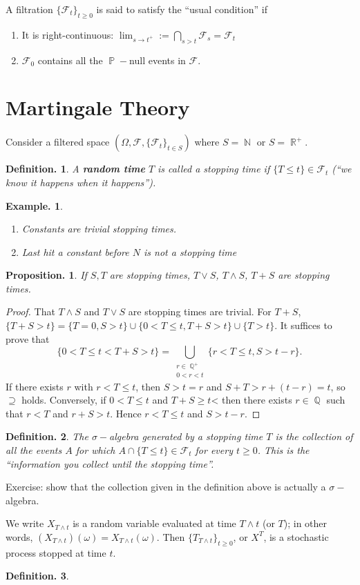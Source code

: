 \documentclass[11pt, a4paper]{memoir}
\DeclareMathOperator{\N}{{\mathbb{N}}}
\DeclareMathOperator{\Q}{{\mathbb{Q}}}
\DeclareMathOperator{\R}{{\mathbb{R}}}
\theoremstyle{change}
\newtheorem{proposition}[theorem]{Proposition.}
\theoremstyle{plain}
\theoremstyle{nonumberplain}
\newtheorem{definition}{Definition.}
\newtheorem{example}{Example.}
\newtheorem{proof}{Proof}
\DeclareMathOperator{\pr}{{\mathbb{P}}}
\newcommand{\defn}[1]{{\boldmath\bfseries #1}}
\numberwithin{equation}{section}
\begin{document}
A filtration $\{\mathcal{F}_t\}_{t\geq 0}$ is said to satisfy the ``usual condition'' if
\begin{enumerate}[nl]
    \item It is right-continuous: $\lim_{s\to t^+}:=\bigcap_{s>t}\mathcal{F}_s=\mathcal{F}_t$
    \item $\mathcal{F}_0$ contains all the $\pr-$null events in $\mathcal{F}$.
\end{enumerate}
\section{Martingale Theory}
Consider a filtered space $(\Omega,\mathcal{F},\{\mathcal{F}_t\}_{t\in S})$ where $S=\N$ or $S=\R^+$.
\begin{definition}
    A \defn{random time} $T$ is called a stopping time if $\{T\leq t\}\in\mathcal{F}_t$ (``we know it happens when it happens'').
\end{definition}
\begin{example}
    \begin{enumerate}[nl,r]
        \item Constants are trivial stopping times.
        \item Last hit a constant before $N$ is not a stopping time
    \end{enumerate}
\end{example}
\begin{proposition}
    If $S,T$ are stopping times, $T\vee S$, $T\wedge S$, $T+S$ are stopping times.
\end{proposition}
\begin{proof}
    That $T\wedge S$ and $T\vee S$ are stopping times are trivial.
    For $T+S$, $\{T+S>t\}=\{T=0,S>t\}\cup\{0<T\leq t,T+S>t\}\cup\{T>t\}$.
    It suffices to prove that
    \begin{equation*}
        \{0<T\leq t<T+S>t\}=\bigcup_{\substack{r\in\Q^+\\0<r<t}}\{r<T\leq t,S>t-r\}.
    \end{equation*}
    If there exists $r$ with $r<T\leq t$, then $S>t=r$ and $S+T>r+(t-r)=t$, so $\supseteq$ holds.
    Conversely, if $0<T\leq t$ and $T+S\geq t$< then there exists $r\in\Q$ such that $r<T$ and $r+S>t$.
    Hence $r<T\leq t$ and $S>t-r$.
\end{proof}
\begin{definition}
    The $\sigma-$algebra generated by a stopping time $T$ is the collection of all the events $A$ for which $A\cap\{T\leq t\}\in\mathcal{F}_t$ for every $t\geq 0$.
    This is the ``information you collect until the stopping time''.
\end{definition}
Exercise: show that the collection given in the definition above is actually a $\sigma-$algebra.

We write $X_{T\wedge t}$ is a random variable evaluated at time $T\wedge t$ (or $T$); in other words, $(X_{T\wedge t})(\omega)=X_{T\wedge t}(\omega)$.
Then $\{T_{T\wedge t}\}_{t\geq 0}$, or $X^T$, is a stochastic process stopped at time $t$.
\begin{definition}
\end{definition}
\end{document}

